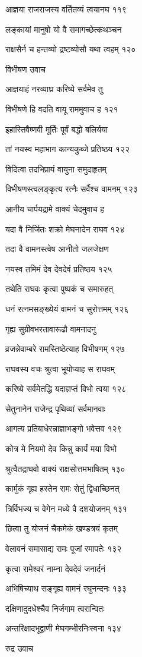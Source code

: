 आज्ञया राजराजस्य वर्तितव्यं त्वयानघ ११९

लङ्कायां मानुषो यो वै समागच्छेत्कथञ्चन

राक्षसैर्न च हन्तव्यो द्रष्टव्योसौ यथा त्वहम् १२०

विभीषण उवाच

आज्ञयाहं नरव्याघ्र करिष्ये सर्वमेव तु

विभीषणे हि वदति वायू राममुवाच ह १२१

इहास्तिवैष्णवी मूर्तिः पूर्वं बद्धो बलिर्यया

तां नयस्व महाभाग कान्यकुब्जे प्रतिष्ठय १२२

विदित्वा तदभिप्रायं वायुना समुदाहृतम्

विभीषणस्त्वलङ्कृत्य रत्नैः सर्वैश्च वामनम् १२३

आनीय चार्पयद्रामे वाक्यं चेदमुवाच ह

यदा वै निर्जितः शक्रो मेघनादेन राघव १२४

तदा वै वामनस्त्वेष आनीतो जलजेक्षण

नयस्व तमिमं देव देवदेवं प्रतिष्ठय १२५

तथेति राघवः कृत्वा पुष्पकं च समारुहत्

धनं रत्नमसङ्ख्येयं वामनं च सुरोत्तमम् १२६

गृह्य सुग्रीवभरतावारूढौ वामनादनु

व्रजन्नेवाम्बरे रामस्तिष्ठेत्याह विभीषणम् १२७

राघवस्य वचः श्रुत्वा भूयोप्याह स राघवम्

करिष्ये सर्वमेतद्धि यदाज्ञप्तं विभो त्वया १२८

सेतुनानेन राजेन्द्र पृथिव्यां सर्वमानवाः

आगत्य प्रतिबाधेरन्नाज्ञाभङ्गो भवेत्तव १२९

कोत्र मे नियमो देव किन्नु कार्यं मया विभो

श्रुत्वैतद्राघवो वाक्यं राक्षसोत्तमभाषितम् १३०

कार्मुकं गृह्य हस्तेन रामः सेतुं द्विधाच्छिनत्

त्रिर्विभज्य च वेगेन मध्ये वै दशयोजनम् १३१

छित्वा तु योजनं चैकमेकं खण्डत्रयं कृतम्

वेलावनं समासाद्य रामः पूजां रमापतेः १३२

कृत्वा रामेश्वरं नाम्ना देवदेवं जनार्दनं

अभिषिच्याथ सङ्गृह्य वामनं रघुनन्दनः १३३

दक्षिणादुदधेश्चैव निर्जगाम त्वरान्वितः

अन्तरिक्षादभूद्वाणी मेघगम्भीरनिःस्वना १३४

रुद्र उवाच


